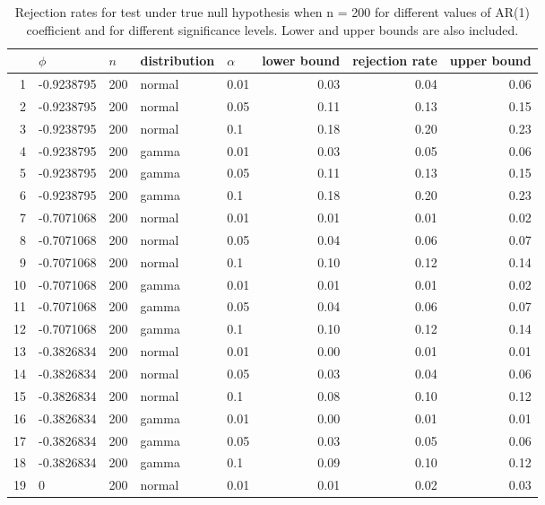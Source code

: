\begin{table}[ht]
\centering
\caption{Rejection rates for test under true null hypothesis
                   when n = 200 for 
                   different values of AR(1) coefficient and for different 
                   significance levels. Lower and upper bounds are also 
                   included.} 
\label{table:rr_200}
\begin{tabular}{rllllrrr}
  \hline
 & $\phi$ & $n$ & distribution & $\alpha$ & lower bound & rejection rate & upper bound \\ 
  \hline
1 & -0.9238795 & 200 & normal & 0.01 & 0.03 & 0.04 & 0.06 \\ 
  2 & -0.9238795 & 200 & normal & 0.05 & 0.11 & 0.13 & 0.15 \\ 
  3 & -0.9238795 & 200 & normal & 0.1 & 0.18 & 0.20 & 0.23 \\ 
  4 & -0.9238795 & 200 & gamma & 0.01 & 0.03 & 0.05 & 0.06 \\ 
  5 & -0.9238795 & 200 & gamma & 0.05 & 0.11 & 0.13 & 0.15 \\ 
  6 & -0.9238795 & 200 & gamma & 0.1 & 0.18 & 0.20 & 0.23 \\ 
  7 & -0.7071068 & 200 & normal & 0.01 & 0.01 & 0.01 & 0.02 \\ 
  8 & -0.7071068 & 200 & normal & 0.05 & 0.04 & 0.06 & 0.07 \\ 
  9 & -0.7071068 & 200 & normal & 0.1 & 0.10 & 0.12 & 0.14 \\ 
  10 & -0.7071068 & 200 & gamma & 0.01 & 0.01 & 0.01 & 0.02 \\ 
  11 & -0.7071068 & 200 & gamma & 0.05 & 0.04 & 0.06 & 0.07 \\ 
  12 & -0.7071068 & 200 & gamma & 0.1 & 0.10 & 0.12 & 0.14 \\ 
  13 & -0.3826834 & 200 & normal & 0.01 & 0.00 & 0.01 & 0.01 \\ 
  14 & -0.3826834 & 200 & normal & 0.05 & 0.03 & 0.04 & 0.06 \\ 
  15 & -0.3826834 & 200 & normal & 0.1 & 0.08 & 0.10 & 0.12 \\ 
  16 & -0.3826834 & 200 & gamma & 0.01 & 0.00 & 0.01 & 0.01 \\ 
  17 & -0.3826834 & 200 & gamma & 0.05 & 0.03 & 0.05 & 0.06 \\ 
  18 & -0.3826834 & 200 & gamma & 0.1 & 0.09 & 0.10 & 0.12 \\ 
  19 & 0 & 200 & normal & 0.01 & 0.01 & 0.02 & 0.03 \\ 

\end{tabular}
\end{table}
